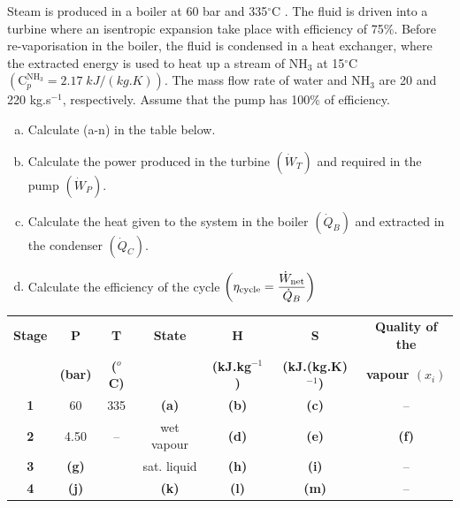 \begin{MyTutorial}{}
%
  \begin{problem}\label{Chapter:ThermodynamicPropertiesPureFluids:Problem:05} %
     Steam is produced in a boiler at 60 bar and 335$^{\circ}$C . The fluid is driven into a turbine where an isentropic expansion take place with efficiency of 75$\%$. Before re-vaporisation in the boiler, the fluid is condensed in a heat exchanger, where the extracted energy is used to heat up a stream of NH$_{3}$ at 15$^{\circ}$C $\left(\text{C}_{p}^{\text{NH}_{3}}=2.17\; kJ/(kg.K)\right)$. The mass flow rate of water and NH$_{3}$ are 20 and 220 kg.s$^{-1}$, respectively. Assume that the pump has 100$\%$ of efficiency.
     \begin{enumerate}[a)]
        \item Calculate (a-n) in the table below.
        \item Calculate the power produced in the turbine $\left(\dot{W}_{T}\right)$ and required in the pump $\left(\dot{W}_{P}\right)$.
        \item Calculate the heat given to the system in the boiler $\left(\dot{Q}_{B}\right)$ and extracted in the condenser $\left(\dot{Q}_{C}\right)$.
        \item Calculate the efficiency of the cycle $\left(\eta_{\text{cycle}}=\displaystyle\frac{\dot{W}_{\text{net}}}{\dot{Q}_{B}}\right)$
     \end{enumerate}
     \begin{center}
       \begin{tabular} {||c | c c c c c c || }
          \hline\hline
          {\bf Stage} & {\bf P}    & {\bf T}        & {\bf State}    & {\bf H}             & {\bf S}                 &  {\bf Quality of the} \\
                                   & {\bf (bar)}& {\bf ($^{o}$C)} &               & {\bf (kJ.kg$^{-1}$)} & {\bf (kJ.(kg.K)$^{-1}$)} &  {\bf vapour $\left(x_{i}\right)$} \\
          \hline\hline
           {\bf 1 }   & 60         & 335            &   {\bf (a)}    & {\bf (b)}           & {\bf (c)}               &   --          \\
           {\bf 2 }   & 4.50       &  --            &   wet vapour   & {\bf (d)}           & {\bf (e)}               &   {\bf (f)}    \\
           {\bf 3 }   & {\bf(g)}   &                &   sat. liquid  & {\bf (h)}           & {\bf (i)}               &   --            \\
           {\bf 4 }   & {\bf(j)}   &                &   {\bf (k)}    & {\bf (l)}           & {\bf (m)}               &   --            \\

\end{tabular}
\end{center}
\end{problem}
\end{MyTutorial}
